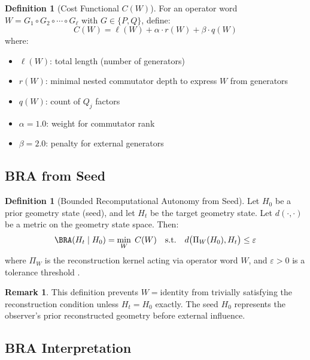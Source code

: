\documentclass[12pt]{article}
\theoremstyle{plain}
\theoremstyle{definition}
\newtheorem{definition}[theorem]{Definition}
\newtheorem{remark}[theorem]{Remark}
\theoremstyle{remark}
\begin{document}

\begin{definition}[Cost Functional $C(W)$]
\statusdef
For an operator word $W = G_1 \circ G_2 \circ \cdots \circ G_\ell$ with $G \in \{P, Q\}$, define:
\[
C(W) = \ell(W) + \alpha \cdot r(W) + \beta \cdot q(W)
\]
where:
\begin{itemize}
    \item $\ell(W)$: total length (number of generators)
    \item $r(W)$: minimal nested commutator depth to express $W$ from generators
    \item $q(W)$: count of $Q_j$ factors
    \item $\alpha = 1.0$: weight for commutator rank 
    \item $\beta = 2.0$: penalty for external generators 
\end{itemize}
\end{definition}

\subsection{BRA from Seed}


\begin{definition}[Bounded Recomputational Autonomy from Seed]
\statusdef
Let $H_0$ be a prior geometry state (seed), and let $H_t$ be the target geometry state. Let $d(\cdot,\cdot)$ be a metric on the geometry state space. Then:
\[
\BRA(H_t \mid H_0) = \min_{W} \; C(W) \quad \text{s.t.} \quad d\bigl(\Pi_W(H_0), H_t\bigr) \le \varepsilon
\]
where $\Pi_W$ is the reconstruction kernel acting via operator word $W$, and $\varepsilon > 0$ is a tolerance threshold .
\end{definition}

\begin{remark}
This definition prevents $W = \text{identity}$ from trivially satisfying the reconstruction condition unless $H_t = H_0$ exactly. The seed $H_0$ represents the observer's prior reconstructed geometry before external influence.
\end{remark}

\subsection{BRA Interpretation}
\end{document}
